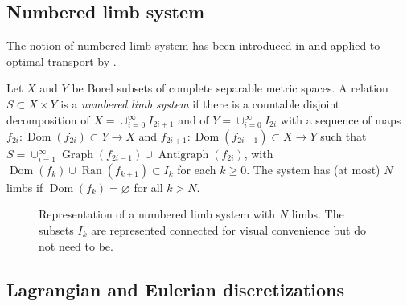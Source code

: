     \subsection{Numbered limb system}
        The notion of numbered limb system has been introduced in \cite{hestir1995supports} and applied to optimal transport by \cite{ahmad2011optimal,chiappori2010hedonic}.
        \begin{defi}
            \label{def:nls}
            Let $X$ and $Y$ be Borel subsets of complete separable metric spaces. A relation $S \subset X \times Y$ is a \emph{numbered limb system} if there is a countable disjoint decomposition of $X=\cup_{i=0}^{\infty} I_{2 i+1}$ and of $Y=\cup_{i=0}^{\infty} I_{2 i}$ with a sequence of maps $f_{2 i}: \operatorname{Dom}(f_{2 i}) \subset Y \longrightarrow X$ and $f_{2 i+1}: \operatorname{Dom}(f_{2 i+1}) \subset X \longrightarrow Y$ such that $S=\cup_{i=1}^{\infty} \operatorname{Graph}(f_{2 i-1}) \cup \operatorname{Antigraph}(f_{2 i})$, with $\operatorname{Dom}(f_{k}) \cup \operatorname{Ran}(f_{k+1}) \subset I_{k}$ for each $k \geq 0$. The system has (at most) $N$ limbs if $\operatorname{Dom}(f_{k})=\varnothing$ for all $k>N$.
        \end{defi}
        \begin{figure}[!h]
            \centering
            
            \caption{Representation of a numbered limb system with $N$ limbs. The subsets $I_k$ are represented connected for visual convenience but do not need to be.}
            \label{fig:NLS2}
        \end{figure}
    \newpage
    \subsection{Lagrangian and Eulerian discretizations}

